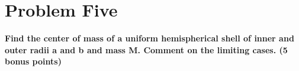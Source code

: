 \documentclass[10pt]{article} %
\begin{document}
\section{Problem Five}
\textbf{Find the center of mass of a uniform hemispherical shell of inner and outer radii a and b and mass M. Comment on the limiting cases. (5 bonus points)} \\ \\
\vspace{1 cm}
\end{document}
